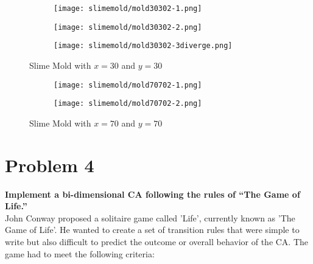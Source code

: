 \begin{figure}[tbh]
\begin{center}
	\begin{subfigure}[tbh]{0.30\textwidth}
	\begin{center}
	\texttt{[image: slimemold/mold30302-1.png]}
	\end{center}
	\end{subfigure}
\hfill
	\begin{subfigure}[tbh]{0.30\textwidth}
	\begin{center}
	\texttt{[image: slimemold/mold30302-2.png]}
	\end{center}
	\end{subfigure}
\hfill
	\begin{subfigure}[tbh]{0.30\textwidth}
	\begin{center}
	\texttt{[image: slimemold/mold30302-3diverge.png]}
	\end{center}
	\end{subfigure}
\caption{ Slime Mold with $x=30$ and $y=30$}
\end{center}
\end{figure} \label{mold3030}


\begin{figure}[tbh]
\begin{center}
	\begin{subfigure}[tbh]{0.40\textwidth}
	\begin{center}
	\texttt{[image: slimemold/mold70702-1.png]}
	\end{center}
	\end{subfigure}
\hfill
	\begin{subfigure}[tbh]{0.40\textwidth}
	\begin{center}
	\texttt{[image: slimemold/mold70702-2.png]}
	\end{center}
	\end{subfigure}
\caption{ Slime Mold with $x=70$ and $y=70$}
\end{center}
\end{figure} \label{mold7070}

\section{ Problem 4 }
\textbf{ Implement a bi-dimensional CA following the rules of ``The Game of Life.'' }\\
\newline
John Conway proposed a solitaire game called 'Life', currently known as 'The Game of Life'. He wanted to create a set of transition rules that were simple to write but also difficult to predict the outcome or overall behavior of the CA. The game had to meet the following criteria:

